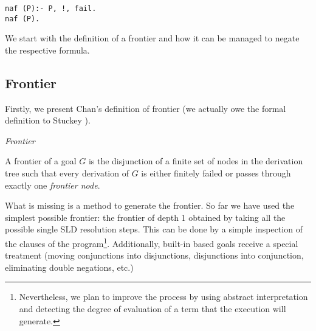 \documentclass{llncs}
\begin{document}
\begin{verbatim}
naf (P):- P, !, fail.
naf (P).
\end{verbatim}

We start with the definition of a frontier and how it can be managed
to negate the respective formula.


\subsection{Frontier}
\label{frontier}

Firstly, we present Chan's definition of frontier (we actually owe the formal
definition to Stuckey \cite{Stuckey95}).

\begin{definition}{\em Frontier}

A frontier of a goal $G$ is the disjunction of a finite set of nodes
in the derivation tree such that every derivation of $G$ is either
finitely failed or passes through exactly one {\em frontier node}.
\end{definition}

What is missing is a method to generate the frontier. So far we have
used the simplest possible frontier: the frontier of depth 1 obtained
by taking all the possible single SLD resolution steps. This can be
done by a simple inspection of the clauses of the
program\footnote{Nevertheless, we plan to improve the process by using
abstract interpretation and detecting the degree of evaluation of a
term that the execution will generate.}.  Additionally, built-in based
goals receive a special treatment (moving conjunctions into
disjunctions, disjunctions into conjunction, eliminating double
negations, etc.)
\end{document}
